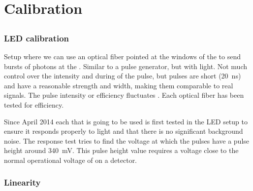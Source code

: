 \chapter{Calibration}
\label{ch:calibration}

\section{\pmt}
\label{sec:pmt}


\subsection{LED calibration}
\label{sub:led_calibration}

Setup where we can use an optical fiber pointed at the windows of the
\pmt to send bursts of photons at the \pmt. Similar to a pulse
generator, but with light. Not much control over the intensity and
during of the pulse, but pulses are short (\SI{20}{\nano\second}) and
have a reasonable strength and width, making them comparable to real
signals. The pulse intensity or efficiency fluctuates .
Each optical fiber has been tested for efficiency.

Since April 2014 each \pmt that is going to be used is first tested in
the LED setup to ensure it responds properly to light and that there is
no significant background noise. The response test tries to find the
voltage at which the pulses have a pulse height around
\SI{340}{\milli\volt}. This pulse height value requires a voltage close
to the normal operational voltage of \pmts on a \hisparc detector.


\subsection{Linearity}

